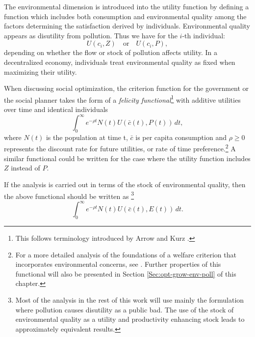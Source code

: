 The environmental dimension is introduced into the utility function by defining a function which includes both consumption and environmental quality among the factors determining the satisfaction derived by individuals. Environmental quality appears as disutility from pollution. Thus we have for the $i$-th individual:
$$
	U(c_i, Z) \quad\text{or}\quad U(c_i, P),
$$
depending on whether the flow or stock of pollution affects utility. In a decentralized economy, individuals treat environmental quality as fixed when maximizing their utility.

When discussing social optimization, the criterion function for the government or the social planner takes the form of a \textit{felicity functional}\footnote{This follows terminology introduced by Arrow and Kurz \cite{kruz_public_1970}.} with additive utilities over time and identical individuals
$$
\int_{0}^{\infty} e^{-\rho t} N(t)U(\bar{c}(t), P(t)) \,dt,
$$
where $N(t)$ is the population at time t, $\bar{c}$ is per capita consumption and $\rho \geq 0$ represents the discount rate for future utilities, or rate of time preference.\footnote{For a more detailed analysis of the foundations of a welfare criterion that incorporates environmental concerns, see \cite{heal_chapter_2005}. Further properties of this functional will also be presented in Section \ref{Sec:opt-grow-env-poll} of this chapter.} A similar functional could be written for the case where the utility function includes $Z$ instead of $P$.

If the analysis is carried out in terms of the stock of environmental quality, then the above functional should be written as \footnote{Most of the analysis in the rest of this work will use mainly the formulation where pollution causes disutility as a public bad. The use of the stock of environmental quality as a utility and productivity enhancing stock leads to approximately equivalent results.}
$$
\int_{0}^{\infty} e^{-\rho t} N(t)U(\bar{c}(t), E(t)) \,dt.
$$


